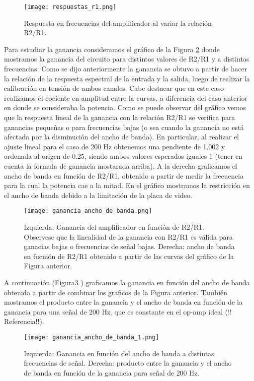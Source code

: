 \documentclass[a4paper, 11pt]{article}
\begin{document}
\begin{figure} [H]
\centering
\texttt{[image: respuestas\_r1.png]}
\caption{ Respuesta en frecuencias del amplificador al variar la relación R2/R1. \label{fig:respuestas_r1}}
\end{figure} 

Para estudiar la ganancia consideramos el gráfico de la Figura \ref{fig:ganancia_ancho_de_banda} donde mostramos la ganancia del circuito para distintos valores de R2/R1 y a distintas frecuencias. Como se dijo anteriormente la ganancia se obtuvo a partir de hacer la relación de la respuesta espectral de la entrada y la salida, luego de realizar la calibración en tensión de ambos canales. Cabe destacar que en este caso realizamos el cociente en amplitud entre la curvas, a diferencia del caso anterior en donde se consideraba la potencia. Como se puede observar del gráfico vemos que la respuesta lineal de la ganancia con la relación R2/R1 se verifica para ganancias pequeñas o para frecuencias bajas (o sea cuando la ganancia no está afectada por la disminución del ancho de banda). En particular, al realizar el ajuste lineal para el caso de 200 Hz obtenemos una pendiente de 1.002 y ordenada al origen de 0.25, siendo ambos valores esperados iguales 1 (tener en cuenta la fórmula de ganancia mostarada arriba). A la derecha graficamos el ancho de banda en función de R2/R1, obtenido a partir de medir la frecuencia para la cual la potencia cae a la mitad. En el gráfico mostramos la restricción en el ancho de banda debido a la limitación de la placa de video.

\begin{figure} [H]
\centering
\texttt{[image: ganancia\_ancho\_de\_banda.png]}
\caption{ Izquierda: Ganancia del amplificador en función de R2/R1. Observese que la linealidad de la ganancia con R2/R1 es válida para ganacias bajas o frecuencias de señal bajas. Derecha: ancho de banda en fucnión de R2/R1 obtenido a partir de las curvas del gráfico de la Figura anterior. \label{fig:ganancia_ancho_de_banda}}
\end{figure} 

A continuación (Figura\ref{fig:ganancia_ancho_de_banda_1} ) graficamos la ganancia en función del ancho de banda obtenida a partir de combinar los graficos de la Figura anterior. También mostramos el producto entre la ganancia y el ancho de banda en función de la ganancia para una señal de 200 Hz, que es constante en el op-amp ideal (!! Referencia!!).

\begin{figure} [H]
\centering
\texttt{[image: ganancia\_ancho\_de\_banda\_1.png]}
\caption{ Izquierda: Ganancia en función del ancho de banda a distintas frecuencias de señal. Derecha: producto entre la ganancia y el ancho de banda en función de la ganancia para señal de 200 Hz. \label{fig:ganancia_ancho_de_banda_1}}
\end{figure} 
\end{document}
